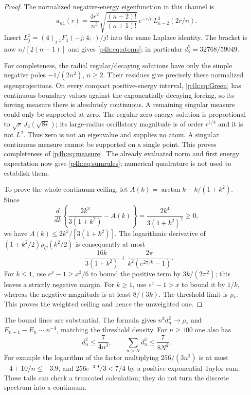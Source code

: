 \documentclass[11pt]{article}
\numberwithin{equation}{section}
\theoremstyle{definition}
\theoremstyle{remark}
\begin{document}
\begin{proof}
The normalized negative-energy eigenfunction in this channel is
\[
 u_{n1}(r)=\frac{4r^2}{n^3}
 \sqrt{\frac{(n-2)!}{(n+1)!}}\,
        e^{-r/n}L_{n-2}^3(2r/n).
\]
Insert $L_j^3=(4)_j\,{}_1F_1(-j;4;\cdot)/j!$ into the same
Laplace identity. The bracket is now $n/[2(n-1)]$ and gives
\eqref{p4h:eq:atoms}; in particular $d_2^2=32768/59049$.

For completeness, the radial regular/decaying solutions have
only the simple negative poles $-1/(2n^2)$, $n\geq2$.
Their residues give precisely these normalized eigenprojections.
On every compact positive-energy interval,
\eqref{p4h:eq:Green} has continuous boundary values against the
exponentially decaying forcing, so its forcing measure there
is absolutely continuous. A remaining singular measure could
only be supported at zero. The regular zero-energy solution is
proportional to $\sqrt r\,J_3(\sqrt{8r})$; its large-radius
oscillatory magnitude is of order $r^{1/4}$ and it is not $L^2$.
Thus zero is not an eigenvalue and supplies no atom.
A singular continuous measure cannot be supported on a single
point. This proves completeness of \eqref{p4h:eq:measure}.
The already evaluated norm and first energy expectation now
give \eqref{p4h:eq:sumrules}; numerical quadrature is not used
to establish them.

To prove the whole-continuum ceiling, let
$A(k)=\arctan k-k/(1+k^2)$. Since
\[
 \frac{d}{dk}\left\{\frac{2k^3}{3(1+k^2)}-A(k)\right\}
             =\frac{2k^4}{3(1+k^2)^2}\geq0,
\]
we have $A(k)\leq2k^3/[3(1+k^2)]$.
The logarithmic derivative of $(1+k^2/2)\rho_C(k^2/2)$
is consequently at most
\[
 -\frac{16k}{3(1+k^2)}
       +\frac{2\pi}{k^2(e^{2\pi/k}-1)}.
\]
For $k\leq1$, use $e^x-1\geq x^3/6$ to bound the positive
term by $3k/(2\pi^2)$; this leaves a strictly negative margin.
For $k\geq1$, use $e^x-1>x$ to bound it by $1/k$,
whereas the negative magnitude is at least $8/(3k)$.
The threshold limit is $\rho_*$. This proves the weighted
ceiling and hence the unweighted one.
\end{proof}

The bound lines are substantial. The formula gives
$n^3d_n^2\longrightarrow\rho_*$ and
$E_{n+1}-E_n\sim n^{-3}$, matching the threshold density.
For $n\geq100$ one also has
\[
 d_n^2\leq\frac7{4n^3},\qquad
              \sum_{n>N}d_n^2\leq\frac7{8N^2}.
\]
For example the logarithm of the factor multiplying $256/(3n^3)$
is at most $-4+10/n\leq-3.9$, and
$256e^{-3.9}/3<7/4$ by a positive exponential Taylor sum.
These tails can check a truncated calculation; they do not
turn the discrete spectrum into a continuum.
\end{document}

